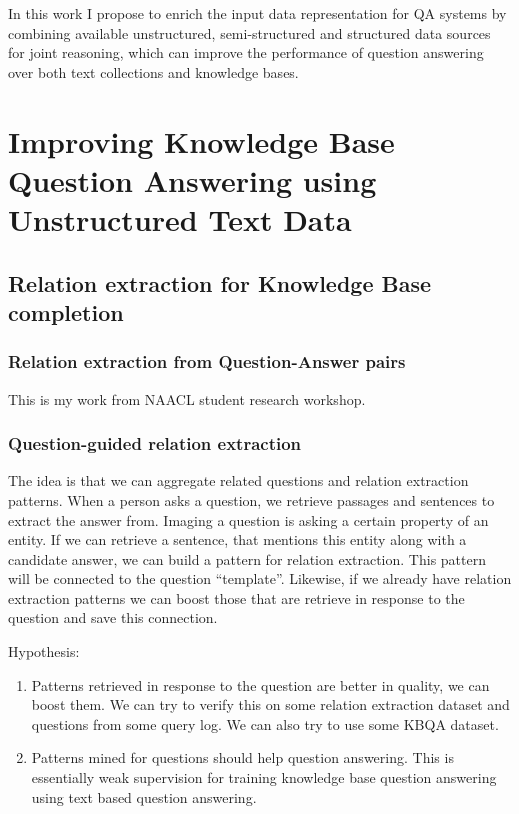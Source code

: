 %

\newif\ifcompress
\compresstrue   %
\compressfalse %


\noindent

In this work I propose to enrich the input data representation for QA systems by combining available unstructured, semi-structured and structured data sources for joint reasoning, which can improve the performance of question answering over both text collections and knowledge bases.


\section{Improving Knowledge Base Question Answering using Unstructured Text Data}

\subsection{Relation extraction for Knowledge Base completion}

\subsubsection{Relation extraction from Question-Answer pairs}
This is my work from NAACL student research workshop.

\subsubsection{Question-guided relation extraction}
The idea is that we can aggregate related questions and relation extraction patterns.
When a person asks a question, we retrieve passages and sentences to extract the answer from.
Imaging a question is asking a certain property of an entity.
If we can retrieve a sentence, that mentions this entity along with a candidate answer, we can build a pattern for relation extraction.
This pattern will be connected to the question ``template''.
Likewise, if we already have relation extraction patterns we can boost those that are retrieve in response to the question and save this connection.

Hypothesis:
\begin{enumerate}
\item Patterns retrieved in response to the question are better in quality, we can boost them. We can try to verify this on some relation extraction dataset and questions from some query log. We can also try to use some KBQA dataset.
\item Patterns mined for questions should help question answering. This is essentially weak supervision for training knowledge base question answering using text based question answering.
\end{enumerate}

